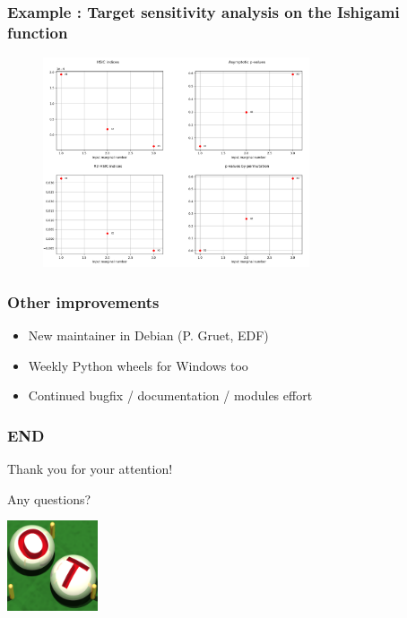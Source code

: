 \documentclass[aspectratio=169]{beamer}
\begin{document}
\begin{frame}
\frametitle{Example : Target sensitivity analysis on the Ishigami function}
\begin{figure}
   \includegraphics[width=0.7\textwidth]{figures/HSIC2.png}
\end{figure}
\end{frame}


\begin{frame}
\frametitle{Other improvements}

\begin{itemize}
\item New maintainer in Debian (P. Gruet, EDF)
\item Weekly Python wheels for Windows too
\item Continued bugfix / documentation / modules effort
\end{itemize}

\end{frame}


\begin{frame}
\frametitle{END}

Thank you for your attention!

Any questions?

\begin{center}
\includegraphics[width=0.2\textwidth]{figures/logo-ot-small}
\end{center}

\end{frame}
\end{document}
